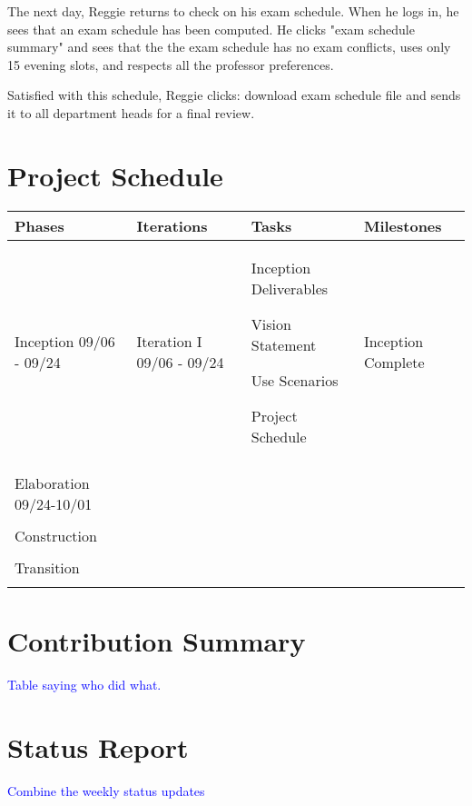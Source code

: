 \documentclass[11pt]{article}
\newenvironment{packed_itemize}{
\begin{itemize}
  \setlength{\itemsep}{1pt}
  \setlength{\parskip}{0pt}
  \setlength{\parsep}{0pt}
}{\end{itemize}}
\begin{document}
\begin{description}
The next day, Reggie returns to check on his exam schedule. When he logs in, he sees
that an exam schedule has been computed. He clicks "exam schedule summary" and sees that
the the exam schedule has no exam conflicts, uses only 15 evening slots, and respects all
the professor preferences. 

Satisfied with this schedule, Reggie clicks: download exam schedule file and sends it to all
department heads for a final review.


\end{description}



\section{Project Schedule} %

\begin{table}
\centering %
\begin{tabular}{|p{0.9in}|p{0.9in}|p{3.2in}|p{.9in}|}
\hline
\textbf{Phases}  & \textbf{Iterations}  & \textbf{Tasks}        & \textbf{Milestones} \\
\hline\hline
 Inception 09/06 - 09/24
   &  Iteration I 09/06 - 09/24  
	& Inception Deliverables
	\vspace{-0.15in}
	 \begin{packed_itemize} 
		\item Vision Statement
		\item Use Scenarios
		\item Project Schedule
   \end{packed_itemize}
	& Inception Complete\\
   &        & & \\
\hline
Elaboration 09/24-10/01& & &\\
& & & \\
\hline
Construction &&& \\
&&& \\
\hline
Transition &&& \\
&&& \\
\hline
\end{tabular}
\end{table}

\section{Contribution Summary} %
\textcolor{blue}{Table saying who did what.}

\section{Status Report} %
\textcolor{blue}{Combine the weekly status updates}
\end{document}

